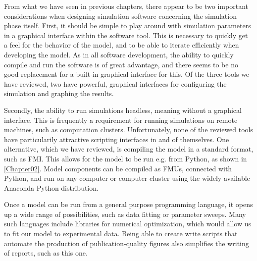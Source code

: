 \documentclass[\rootfolder/main.tex]{subfiles}
\begin{document}
From what we have seen in previous chapters, there appear to be two important considerations when designing simulation software concerning the simulation phase itself.
First, it should be simple to play around with simulation parameters in a graphical interface within the software tool.
This is necessary to quickly get a feel for the behavior of the model, and to be able to iterate efficiently when developing the model.
As in all software development, the ability to quickly compile and run the software is of great advantage, and there seems to be no good replacement for a built-in graphical interface for this.
Of the three tools we have reviewed, two have powerful, graphical interfaces for configuring the simulation and graphing the results.

Secondly, the ability to run simulations headless, meaning without a graphical interface.
This is frequently a requirement for running simulations on remote machines, such as computation clusters.
Unfortunately, none of the reviewed tools have particularily attractive scripting interfaces in and of themselves.
One alternative, which we have reviewed, is compiling the model in a standard format, such as FMI.
This allows for the model to be run e.g. from Python, as shown in \cref{Chapter02}.
Model components can be compiled as FMUs, connected with Python, and run on any computer or computer cluster using the widely available Anaconda Python distribution.

Once a model can be run from a general purpose programming language, it opens up a wide range of possibilities, such as data fitting or parameter sweeps.
Many such languages include libraries for numerical optimization, which would allow us to fit our model to experimental data.
Being able to create write scripts that automate the production of publication-quality figures also simplifies the writing of reports, such as this one.
\end{document}
